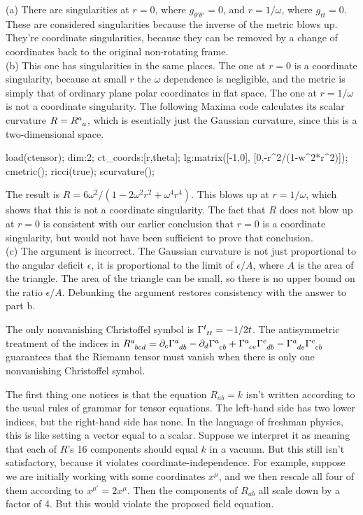 (a) There are singularities at $r=0$, where $g_{\theta'\theta'}=0$, and $r=1/\omega$,
where $g_{tt}=0$. These are considered singularities because the inverse of the metric
blows up. They're coordinate singularities, because they can be removed by a change of
coordinates back to the original non-rotating frame.\\
(b) This one has singularities in
the same places. The one at $r=0$ is a coordinate singularity, because at small $r$
the $\omega$ dependence is negligible, and the metric is simply that of ordinary
plane polar coordinates in flat space. The one at $r=1/\omega$ is not a coordinate
singularity. The following Maxima code calculates its scalar curvature $R=R\indices{^a_a}$,
which is esentially just the Gaussian curvature, since this is a two-dimensional space.
\begin{listing}{1}
load(ctensor);
dim:2;
ct_coords:[r,theta];
lg:matrix([-1,0],
          [0,-r^2/(1-w^2*r^2)]);
cmetric();   
ricci(true);
scurvature();
\end{listing}
The result is $R=6\omega^2/(1-2\omega^2r^2+\omega^4r^4)$.
This blows up at $r=1/\omega$, which shows that this is not a coordinate
singularity. The fact that $R$ does not blow up at $r=0$ is consistent with our
earlier conclusion that $r=0$ is a coordinate singularity, but would not have been
sufficient to prove that conclusion.\\
(c) The argument is incorrect. The Gaussian curvature is not just proportional to
the angular deficit $\epsilon$, it is proportional to the
limit of $\epsilon/A$, where $A$ is the area of the triangle. The area of the triangle
can be small, so there is no upper bound on the ratio $\epsilon/A$.
Debunking the argument restores consistency with the answer to part b.

The only nonvanishing Christoffel symbol is $\Gamma\indices{^t_{tt}}=-1/2t$. The antisymmetric
treatment of the indices in $R\indices{^a_{bcd}} = \partial_c \Gamma\indices{^a_{db}} - \partial_d \Gamma\indices{^a_{cb}}
                        + \Gamma\indices{^a_{ce}}\Gamma\indices{^e_{db}}-\Gamma\indices{^a_{de}}\Gamma\indices{^e_{cb}}$
guarantees that the Riemann tensor must vanish when there is only one nonvanishing Christoffel symbol.

The first thing one notices is that the equation $R_{ab}=k$ isn't written according to the usual rules of grammar
for tensor equations. The left-hand side has two lower indices, but the right-hand side has none. In the language of freshman physics,
this is like setting a vector equal to a scalar. Suppose we interpret it as meaning that each of $R$'s 16 components should equal
$k$ in a vacuum. But this still isn't satisfactory, because it violates coordinate-independence. For example, suppose we
are initially working with some coordinates $x^\mu$, and we then rescale all four of them according to $x^{\mu'}=2x^\mu$.
Then the components of $R_{ab}$ all scale down by a factor of 4. But this would violate the proposed field equation.

